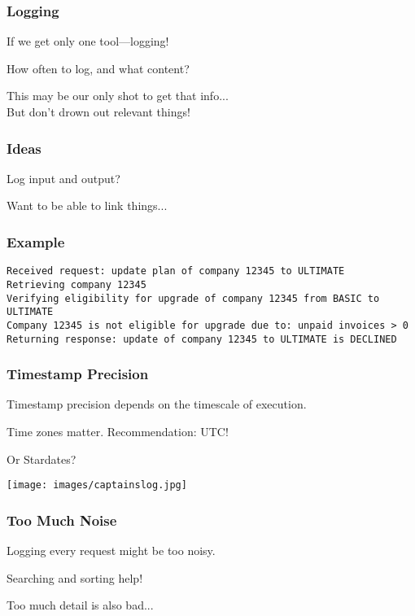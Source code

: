 \begin{frame}
\frametitle{Logging} 

If we get only one tool---logging!

How often to log, and what content?

This may be our only shot to get that info...\\
\quad But don't drown out relevant things!


\end{frame}


\begin{frame}
\frametitle{Ideas}

Log input and output?

Want to be able to link things...


\end{frame}


\begin{frame}[fragile]
\frametitle{Example}

{\scriptsize
\begin{verbatim}
Received request: update plan of company 12345 to ULTIMATE
Retrieving company 12345
Verifying eligibility for upgrade of company 12345 from BASIC to ULTIMATE
Company 12345 is not eligible for upgrade due to: unpaid invoices > 0
Returning response: update of company 12345 to ULTIMATE is DECLINED
\end{verbatim}
}

\end{frame}


\begin{frame}
\frametitle{Timestamp Precision}

Timestamp precision depends on the timescale of execution.

Time zones matter. Recommendation: UTC!

Or Stardates?

\begin{center}
	\texttt{[image: images/captainslog.jpg]}
\end{center}

\end{frame}


\begin{frame}
\frametitle{Too Much Noise}

Logging every request might be too noisy.

Searching and sorting help!

Too much detail is also bad...

\end{frame}


